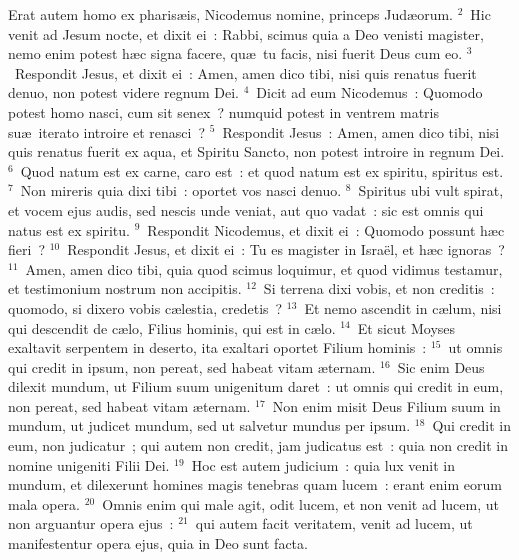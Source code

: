 \lettrine[lines=3,image=true,loversize=0.05,lraise=-0.03]{E}{}rat autem homo ex pharis\ae is, Nicodemus nomine, princeps Jud\ae orum.
${}^{2}$~Hic venit ad Jesum nocte, et dixit ei~: Rabbi, scimus quia a Deo venisti magister, nemo enim potest h\ae c signa facere, qu\ae\ tu facis, nisi fuerit Deus cum eo.
${}^{3}$~Respondit Jesus, et dixit ei~: Amen, amen dico tibi, nisi quis renatus fuerit denuo, non potest videre regnum Dei.
${}^{4}$~Dicit ad eum Nicodemus~: Quomodo potest homo nasci, cum sit senex~? numquid potest in ventrem matris su\ae\ iterato introire et renasci~?
${}^{5}$~Respondit Jesus~: Amen, amen dico tibi, nisi quis renatus fuerit ex aqua, et Spiritu Sancto, non potest introire in regnum Dei.
${}^{6}$~Quod natum est ex carne, caro est~: et quod natum est ex spiritu, spiritus est.
${}^{7}$~Non mireris quia dixi tibi~: oportet vos nasci denuo.
${}^{8}$~Spiritus ubi vult spirat, et vocem ejus audis, sed nescis unde veniat, aut quo vadat~: sic est omnis qui natus est ex spiritu.
${}^{9}$~Respondit Nicodemus, et dixit ei~: Quomodo possunt h\ae c fieri~?
${}^{10}$~Respondit Jesus, et dixit ei~: Tu es magister in Isra\"el, et h\ae c ignoras~?
${}^{11}$~Amen, amen dico tibi, quia quod scimus loquimur, et quod vidimus testamur, et testimonium nostrum non accipitis.
${}^{12}$~Si terrena dixi vobis, et non creditis~: quomodo, si dixero vobis c\ae lestia, credetis~?
${}^{13}$~Et nemo ascendit in c\ae lum, nisi qui descendit de c\ae lo, Filius hominis, qui est in c\ae lo.
${}^{14}$~Et sicut Moyses exaltavit serpentem in deserto, ita exaltari oportet Filium hominis~:
${}^{15}$~ut omnis qui credit in ipsum, non pereat, sed habeat vitam \ae ternam.
${}^{16}$~Sic enim Deus dilexit mundum, ut Filium suum unigenitum daret~: ut omnis qui credit in eum, non pereat, sed habeat vitam \ae ternam.
${}^{17}$~Non enim misit Deus Filium suum in mundum, ut judicet mundum, sed ut salvetur mundus per ipsum.
${}^{18}$~Qui credit in eum, non judicatur~; qui autem non credit, jam judicatus est~: quia non credit in nomine unigeniti Filii Dei.
${}^{19}$~Hoc est autem judicium~: quia lux venit in mundum, et dilexerunt homines magis tenebras quam lucem~: erant enim eorum mala opera.
${}^{20}$~Omnis enim qui male agit, odit lucem, et non venit ad lucem, ut non arguantur opera ejus~:
${}^{21}$~qui autem facit veritatem, venit ad lucem, ut manifestentur opera ejus, quia in Deo sunt facta.


